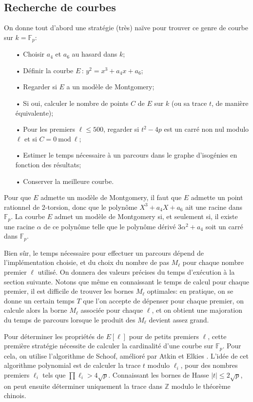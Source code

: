 \documentclass[11pt,a4paper]{article}
\newcommand{\Z}{\mathbb{Z}}
\newcommand{\F}{\mathbb{F}}
\newcommand{\de}{\,:\,}
\renewcommand{\mod}{\ \mathrm{mod}\ }
\renewcommand{\v}{\vspace{5mm}}
\theoremstyle{definition}
\begin{document}
\subsection{Recherche de courbes}

On donne tout d'abord une stratégie (très) naïve pour trouver ce genre de courbe sur $k = \F_p$:
\begin{itemize}
\item[•] Choisir $a_4$ et $a_6$ au hasard dans $k$;
\item[•] Définir la courbe $E\de y^2 = x^3 + a_4x + a_6$;
\item[•] Regarder si $E$ a un modèle de Montgomery;
\item[•] Si oui, calculer le nombre de points $C$ de $E$ sur $k$ (ou sa trace $t$, de manière équivalente);
\item[•] Pour les premiers $\ell\leq 500$, regarder si $t^2 - 4p$ est un carré non nul modulo $\ell$ et si $C = 0 \mod\ell$;
\item[•] Estimer le temps nécessaire à un parcours dans le graphe d'isogénies en fonction des résultats;
\item[•] Conserver la meilleure courbe.
\end{itemize}

Pour que $E$ admette un modèle de Montgomery, il faut que $E$ admette un point rationnel de 2-torsion, donc que le polynôme $X^3 + a_4 X + a_6$ ait une racine dans $\F_p$. La courbe $E$ admet un modèle de Montgomery si, et seulement si, il existe une racine $\alpha$ de ce polynôme telle que le polynôme dérivé $3\alpha^2 + a_4$ soit un carré dans $\F_p$.

Bien sûr, le temps nécessaire pour effectuer un parcours dépend de l'implémentation choisie, et du choix du nombre de pas $M_\ell$ pour chaque nombre premier $\ell$ utilisé. On donnera des valeurs précises du temps d'exécution à la section suivante. Notons que même en connaissant le temps de calcul pour chaque premier, il est difficile de trouver les bornes $M_\ell$ optimales: en pratique, on se donne un certain temps $T$ que l'on accepte de dépenser pour chaque premier, on calcule alors la borne $M_\ell$ associée pour chaque $\ell$, et on obtient une majoration du temps de parcours lorsque le produit des $M_\ell$ devient assez grand.

\v
Pour déterminer les propriétés de $E[\ell]$ pour de petits premiers $\ell$, cette première stratégie nécessite de calculer la cardinalité d'une courbe sur $\F_p$. Pour cela, on utilise l'algorithme de Schoof, amélioré par Atkin et Elkies \cite{Schoof}. L'idée de cet algorithme polynomial est de calculer la trace $t$ modulo $\ell_i$, pour des nombres premiers $\ell_i$ tels que $\prod \ell_i > 4\sqrt{p}$. Connaissant les bornes de Hasse $|t|\leq 2\sqrt{p}$, on peut ensuite déterminer uniquement la trace dans $\Z$ modulo le théorème chinois.
\end{document}
